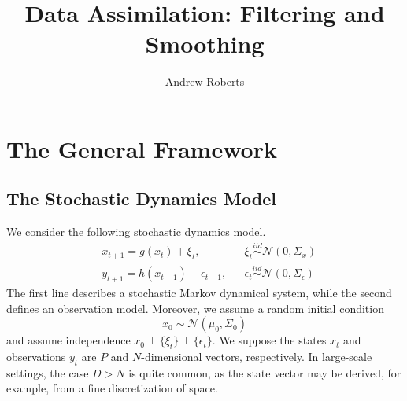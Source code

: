 \documentclass[12pt]{article}
\title{Data Assimilation: Filtering and Smoothing}
\author{Andrew Roberts}
\begin{document}
\maketitle
\tableofcontents
\newpage

\section{The General Framework}

\subsection{The Stochastic Dynamics Model}
We consider the following stochastic dynamics model. 
\begin{align}
&x_{t + 1} = g(x_t) + \xi_t, && \xi_t \overset{iid}{\sim} \mathcal{N}(0, \Sigma_x) \label{stochastic_dynamics_model} \\
&y_{t + 1} = h(x_{t+1}) + \epsilon_{t+1}, && \epsilon_t \overset{iid}{\sim} \mathcal{N}(0, \Sigma_\epsilon) \nonumber 
\end{align}
The first line describes a stochastic Markov dynamical system, while the second defines an observation model. Moreover, we assume a random initial condition 
\[x_0 \sim \mathcal{N}(\mu_0, \Sigma_0)\]
and assume independence $x_0 \perp \{\xi_t\} \perp \{\epsilon_t\}$. We suppose the states $x_t$ and observations $y_t$ are $P$ and $N$-dimensional vectors, respectively. 
In large-scale settings, the case $D > N$ is quite common, as the state vector may be derived, for example, from a fine discretization of space. 
\end{document}
